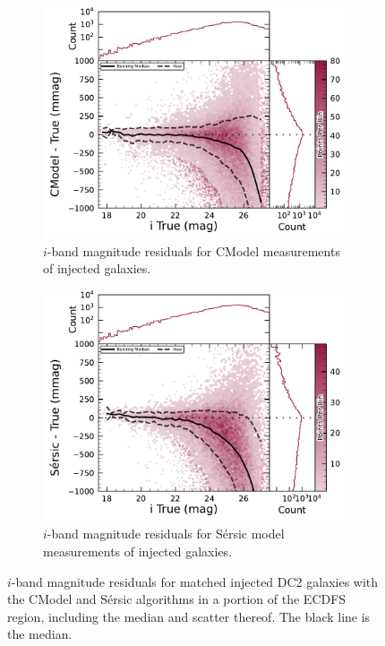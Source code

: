 \begin{figure}[hbt!]
  \centering
  \begin{subfigure}[t]{0.45\textwidth}
  \includegraphics[width=\linewidth]{injected_lsst_cells_v1_5063_i_mag_cmodel}
  \caption{$i$-band magnitude residuals for CModel measurements of injected galaxies.}
  \end{subfigure}\hfill
  \begin{subfigure}[t]{0.45\textwidth}
  \includegraphics[width=\linewidth]{injected_lsst_cells_v1_5063_i_mag_sersic}
  \caption{$i$-band magnitude residuals for S\'ersic model measurements of injected galaxies.}
  \end{subfigure}\hfill
\caption{$i$-band magnitude residuals for matched injected DC2 galaxies with the CModel and S\'ersic algorithms in a portion of the \gls{ECDFS} region, including the median and scatter thereof.
The black line is the median.}
\label{fig:injected_lsst_cells_v1_5063_i_mag}
\end{figure}
